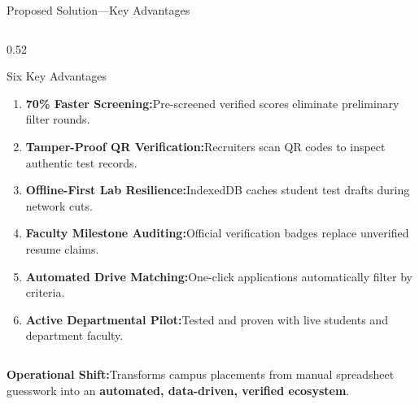 \documentclass[aspectratio=169,10pt,xcolor={table,dvipsnames}]{beamer}
\begin{document}
\begin{frame}[t]{Proposed Solution\enspace---\enspace Key Advantages}
\begin{columns}[T]
    \begin{column}{0.52\textwidth}
      \begin{plaincard}{Six Key Advantages}
        \fontsize{6.3}{7.5}\selectfont
        \begin{enumerate}\setlength{\itemsep}{0.4pt}
          \item \textbf{70\% Faster Screening:}\;Pre-screened verified scores eliminate preliminary filter rounds.
          \item \textbf{Tamper-Proof QR Verification:}\;Recruiters scan QR codes to inspect authentic test records.
          \item \textbf{Offline-First Lab Resilience:}\;IndexedDB caches student test drafts during network cuts.
          \item \textbf{Faculty Milestone Auditing:}\;Official verification badges replace unverified resume claims.
          \item \textbf{Automated Drive Matching:}\;One-click applications automatically filter by criteria.
          \item \textbf{Active Departmental Pilot:}\;Tested and proven with live students and department faculty.
        \end{enumerate}
      \end{plaincard}
    \end{column}
  \end{columns}

  \vspace{0.02cm}
  \begin{tcolorbox}[
    enhanced,colback=LightSilver,colframe=BorderColor,
    arc=2pt,boxrule=0.6pt,
    left=5pt,right=5pt,top=2pt,bottom=2pt]
    \centering\fontsize{6.2}{7.4}\selectfont
    \textbf{\color{Navy}Operational Shift:}\;Transforms campus placements from manual spreadsheet guesswork into an \textbf{automated, data-driven, verified ecosystem}.
  \end{tcolorbox}
\end{frame}
\end{document}
